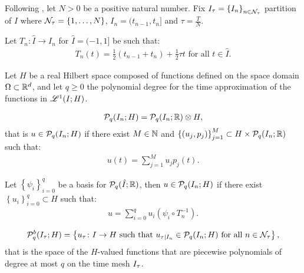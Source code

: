 Following \cite[p. 177]{Ern2021}, let $N > 0$ be a positive natural number. Fix $I_{\tau} = \left\{ I_n \right\}_{n \in \mathcal{N}_{\tau}}$ partition of $I$ where $\mathcal{N}_{\tau} = \left\{ 1, \dots, N \right\}$, $I_n = (t_{n - 1}, t_n]$ and $\tau = \frac{T}{N}$.

\begin{definition}[Mapping]
    Let $T_n \colon \hat{I} \rightarrow I_n$ for $\hat{I} = (-1, 1]$ be such that:
    \begin{gather}
        T_n(t) = \frac{1}{2}(t_{n - 1} + t_n) + \frac{1}{2} \tau t \text{ for all } t \in \hat{I}.
    \end{gather}
\end{definition}

Let $H$ be a real Hilbert space composed of functions defined on the space domain $\Omega \subset \mathbb{R}^{d}$, and let $q \geq 0$ the polynomial degree for the time approximation of the functions in $\mathscr{L}^{1}(I; H)$.

\begin{definition}[$\SpacePolynomials{q}(I_n; H)$]
    \begin{gather}
        \mathcal{P}_{q}(I_n; H) = \mathcal{P}_{q}(I_n; \mathbb{R}) \otimes H,
    \end{gather}
    that is $u \in \mathcal{P}_{q}(I_n; H)$ if there exist $M \in \mathbb{N}$ and $\left\{ (u_j, p_j) \right\}_{j = 1}^M \subset H \times \mathcal{P}_{q}(I_n; \mathbb{R})$ such that:
    \begin{gather}
        u(t) = \sum_{j = 1}^M u_j p_j(t).
    \end{gather}
\end{definition}

Let $\left\{ \psi_i \right\}_{i = 0}^q$ be a basis for $\mathcal{P}_{q}(\hat{I}; \mathbb{R})$, then $u \in \mathcal{P}_{q}(I_n; H)$ if there exist $\left\{ u_i \right\}_{i = 0}^q \subset H$ such that:
\begin{gather} %
    u = \sum_{i = 0}^q u_i (\psi_i \circ T_n^{-1}).
\end{gather}

\begin{definition}
    \begin{gather}
        \mathcal{P}_{q}^b(I_{\tau}; H) = \left\{ u_{\tau} \colon I \rightarrow H \text{ such that } u_{\tau \mid I_n} \in \mathcal{P}_{q}(I_n; H) \text{ for all } n \in \mathcal{N}_{\tau} \right\},
    \end{gather}
    that is the space of the $H$-valued functions that are piecewise polynomials of degree at most $q$ on the time mesh $I_{\tau}$.
\end{definition}

